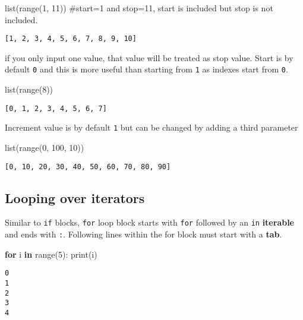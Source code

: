 \documentclass[
  letterpaper,
  DIV=11,
  numbers=noendperiod]{scrreprt}
\newenvironment{Shaded}{\begin{snugshade}}{\end{snugshade}}
\newcommand{\BuiltInTok}[1]{\textcolor[rgb]{0.00,0.23,0.31}{#1}}
\newcommand{\CommentTok}[1]{\textcolor[rgb]{0.37,0.37,0.37}{#1}}
\newcommand{\ControlFlowTok}[1]{\textcolor[rgb]{0.00,0.23,0.31}{\textbf{#1}}}
\newcommand{\DecValTok}[1]{\textcolor[rgb]{0.68,0.00,0.00}{#1}}
\newcommand{\KeywordTok}[1]{\textcolor[rgb]{0.00,0.23,0.31}{\textbf{#1}}}
\newcommand{\NormalTok}[1]{\textcolor[rgb]{0.00,0.23,0.31}{#1}}
\begin{document}
\begin{Shaded}
\begin{Highlighting}[]
\BuiltInTok{list}\NormalTok{(}\BuiltInTok{range}\NormalTok{(}\DecValTok{1}\NormalTok{, }\DecValTok{11}\NormalTok{)) }\CommentTok{\#start=1 and stop=11, start is included but stop is not included.}
\end{Highlighting}
\end{Shaded}

\begin{verbatim}
[1, 2, 3, 4, 5, 6, 7, 8, 9, 10]
\end{verbatim}

if you only input one value, that value will be treated as stop value.
Start is by default \texttt{0} and this is more useful than starting
from \texttt{1} as indexes start from \texttt{0}.

\begin{Shaded}
\begin{Highlighting}[]
\BuiltInTok{list}\NormalTok{(}\BuiltInTok{range}\NormalTok{(}\DecValTok{8}\NormalTok{))}
\end{Highlighting}
\end{Shaded}

\begin{verbatim}
[0, 1, 2, 3, 4, 5, 6, 7]
\end{verbatim}

Increment value is by default \texttt{1} but can be changed by adding a
third parameter

\begin{Shaded}
\begin{Highlighting}[]
\BuiltInTok{list}\NormalTok{(}\BuiltInTok{range}\NormalTok{(}\DecValTok{0}\NormalTok{, }\DecValTok{100}\NormalTok{, }\DecValTok{10}\NormalTok{))}
\end{Highlighting}
\end{Shaded}

\begin{verbatim}
[0, 10, 20, 30, 40, 50, 60, 70, 80, 90]
\end{verbatim}

\section{Looping over iterators}\label{looping-over-iterators}

Similar to \texttt{if} blocks, \texttt{for} loop block starts with
\texttt{for} followed by an \texttt{in} \textbf{iterable} and ends with
\texttt{:}. Following lines within the for block must start with a
\textbf{tab}.

\begin{Shaded}
\begin{Highlighting}[]
\ControlFlowTok{for}\NormalTok{ i }\KeywordTok{in} \BuiltInTok{range}\NormalTok{(}\DecValTok{5}\NormalTok{):}
    \BuiltInTok{print}\NormalTok{(i)}
\end{Highlighting}
\end{Shaded}

\begin{verbatim}
0
1
2
3
4
\end{verbatim}

\chapter{}\label{section}
\end{document}
